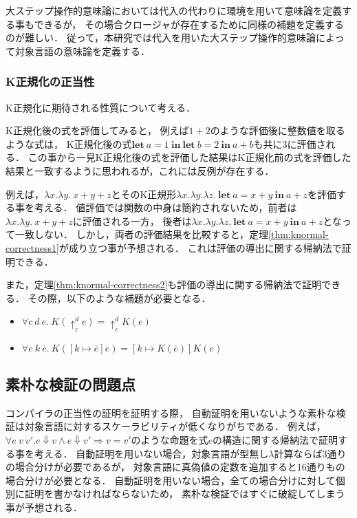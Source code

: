 \documentclass[T]{compsoft}
\newcommand{\keyword}[1]{\mathbf{#1}}
\newcommand{\LET}{\keyword{let}}
\newcommand{\IN}{\keyword{in}}
\begin{document}
大ステップ操作的意味論においては代入の代わりに環境を用いて意味論を定義する事もできるが，
その場合クロージャが存在するために同様の補題を定義するのが難しい．
従って，本研究では代入を用いた大ステップ操作的意味論によって対象言語の意味論を定義する．

\subsubsection{K正規化の正当性}
K正規化に期待される性質について考える．

K正規化後の式を評価してみると，
例えば$1+2$のような評価後に整数値を取るような式は，
K正規化後の式$\LET~a = 1~\IN~\LET~b = 2~\IN~a + b$も共に3に評価される．
この事から一見K正規化後の式を評価した結果はK正規化前の式を評価した結果と一致するように思われるが，これには反例が存在する．

例えば，$\lambda x.\lambda y.~x+y+z$とそのK正規形$\lambda x.\lambda y.\lambda z.~\LET~a = x+y~\IN~a + z$を評価する事を考える．
値評価では関数の中身は簡約されないため，前者は$\lambda x.\lambda y.~x+y+z$に評価される一方，
後者は$\lambda x.\lambda y.\lambda z.~\LET~a = x+y~\IN~a + z$となって一致しない．
しかし，両者の評価結果を比較すると，定理\ref{thm:knormal-correctness1}が成り立つ事が予想される．
これは評価の導出に関する帰納法で証明できる．

また，定理\ref{thm:knormal-correctness2}も評価の導出に関する帰納法で証明できる．
その際，以下のような補題が必要となる．

\begin{itemize}
	\item $\forall c~d~e.~K(\uparrow^d_c e) = \uparrow^d_c K(e)$
	\item $\forall e~k~\overline{e}.~K([k \mapsto \overline{e}]e)=[k \mapsto K(\overline{e})]K(e)$
\end{itemize}

\subsection{素朴な検証の問題点}
コンパイラの正当性の証明を証明する際，
自動証明を用いないような素朴な検証は対象言語に対するスケーラビリティが低くなりがちである．
例えば，$\forall e~v~v'.e\Downarrow v \land e\Downarrow v' \Longrightarrow v = v'$のような命題を式$e$の構造に関する帰納法で証明する事を考える．
自動証明を用いない場合，対象言語が型無し$\lambda$計算ならば3通りの場合分けが必要であるが，
対象言語に真偽値の定数を追加すると16通りもの場合分けが必要となる．
自動証明を用いない場合，全ての場合分けに対して個別に証明を書かなければならないため，
素朴な検証ではすぐに破綻してしまう事が予想される．
\end{document}
